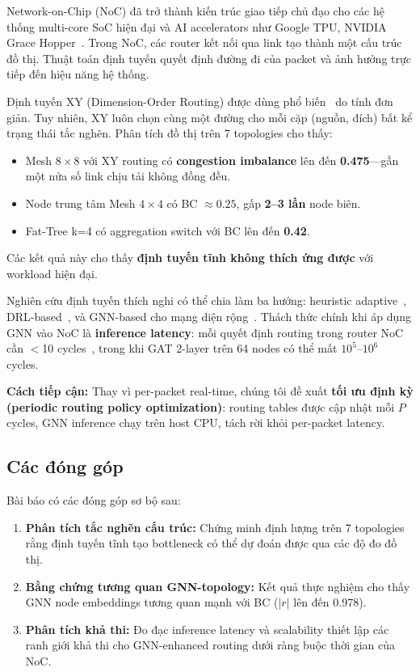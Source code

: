 \documentclass[conference]{IEEEtran}
\begin{document}
Network-on-Chip (NoC) đã trở thành kiến trúc giao tiếp chủ đạo cho các hệ thống
multi-core SoC hiện đại và AI accelerators như Google TPU, NVIDIA Grace
Hopper~\cite{mirhoseini2021}. Trong NoC, các router kết nối qua link tạo thành
một cấu trúc đồ thị. Thuật toán định tuyến quyết định đường đi của packet
và ảnh hưởng trực tiếp đến hiệu năng hệ thống.

Định tuyến XY (Dimension-Order Routing) được dùng phổ biến~\cite{wang2022maar}
do tính đơn giản. Tuy nhiên, XY luôn chọn cùng một đường cho mỗi cặp
(nguồn, đích) bất kể trạng thái tắc nghẽn. Phân tích đồ thị trên 7 topologies
cho thấy:

\begin{itemize}
    \item Mesh $8\times8$ với XY routing có \textbf{congestion imbalance} lên đến
    \textbf{0.475}---gần một nửa số link chịu tải không đồng đều.
    \item Node trung tâm Mesh $4\times4$ có BC $\approx 0.25$, gấp \textbf{2--3 lần}
    node biên.
    \item Fat-Tree k=4 có aggregation switch với BC lên đến \textbf{0.42}.
\end{itemize}

Các kết quả này cho thấy \textbf{định tuyến tĩnh không thích ứng được}
với workload hiện đại.

Nghiên cứu định tuyến thích nghi có thể chia làm ba hướng: heuristic
adaptive~\cite{dyad2004,ebrahimi2019}, DRL-based~\cite{wang2022maar,deepnr2022},
và GNN-based cho mạng diện rộng~\cite{g-routing2023}. Thách thức chính khi áp
dụng GNN vào NoC là \textbf{inference latency}: mỗi quyết định routing trong
router NoC cần $<$10 cycles~\cite{wang2022maar}, trong khi GAT 2-layer trên
64 nodes có thể mất $10^5$--$10^6$ cycles.

\textbf{Cách tiếp cận:} Thay vì per-packet real-time, chúng tôi đề xuất
\textbf{tối ưu định kỳ (periodic routing policy optimization)}:
routing tables được cập nhật mỗi $P$ cycles, GNN inference chạy trên host
CPU, tách rời khỏi per-packet latency.

\subsection{Các đóng góp}

Bài báo có các đóng góp sơ bộ sau:
\begin{enumerate}
    \item \textbf{Phân tích tắc nghẽn cấu trúc:} Chứng minh định lượng trên
    7 topologies rằng định tuyến tĩnh tạo bottleneck có thể dự đoán được
    qua các độ đo đồ thị.
    \item \textbf{Bằng chứng tương quan GNN-topology:} Kết quả thực nghiệm
    cho thấy GNN node embeddings tương quan mạnh với BC ($|r|$ lên đến 0.978).
    \item \textbf{Phân tích khả thi:} Đo đạc inference latency và scalability
    thiết lập các ranh giới khả thi cho GNN-enhanced routing dưới ràng buộc
    thời gian của NoC.
\end{enumerate}
\end{document}
